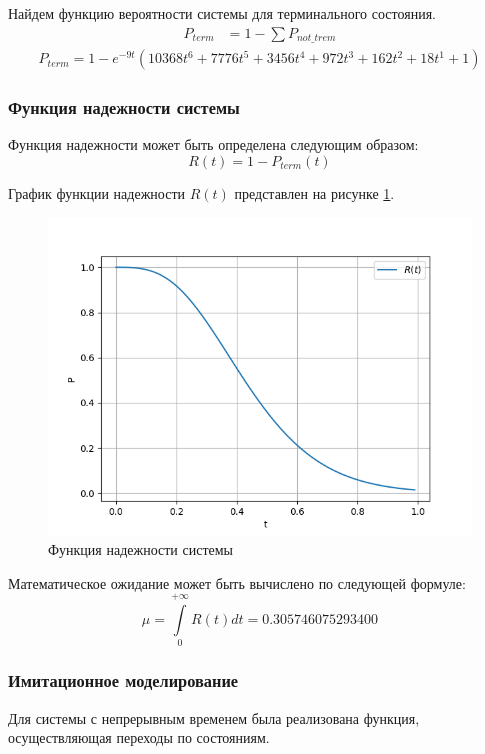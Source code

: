 Найдем функцию вероятности системы для терминального состояния.
\begin{align*}
    P_{term}&=1 - \sum P_{not\_trem}
\end{align*}
\begin{equation}
    \begin{aligned}
    P_{term} = 1 - e^{-9 t} ( 10368t^6 + 7776t^5 + 3456t^4 + 972t^3 + 162t^2 + 18t^1 + 1 )
    \end{aligned}
\end{equation}

\subsubsection{Функция надежности системы}

Функция надежности может быть определена следующим образом:
$$R(t)= 1 - P_{term}(t)$$

График функции надежности $R(t)$ представлен на рисунке \ref{R_t}.
\begin{figure}[H]
\centerline{\includegraphics[scale = .8]{Images/R_t.png}}
\caption{Функция надежности системы}
\label{R_t}
\end{figure}
Математическое ожидание может быть вычислено по следующей формуле:
$$\mu = \int\limits_0^{+\infty}R(t)dt = 0.305746075293400$$

\subsubsection{Имитационное моделирование}

Для системы с непрерывным временем была реализована функция, осуществляющая переходы по состояниям.

